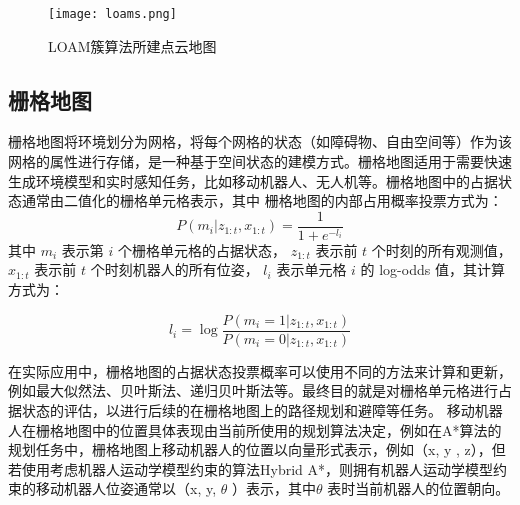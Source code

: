 \begin{figure}[ht]
    \centering
    \texttt{[image: loams.png]}
    \caption{LOAM簇算法所建点云地图}
\end{figure}

\subsection{栅格地图}
栅格地图将环境划分为网格，将每个网格的状态（如障碍物、自由空间等）作为该网格的属性进行存储，是一种基于空间状态的建模方式。栅格地图适用于需要快速生成环境模型和实时感知任务，比如移动机器人、无人机等。栅格地图中的占据状态通常由二值化的栅格单元格表示，其中
栅格地图的内部占用概率投票方式\cite{durrant2006simultaneous}为：
\begin{equation}
P(m_i | z_{1:t}, x_{1:t}) = \frac{1}{1 + e^{-l_i}}
\end{equation}
其中 $m_i$ 表示第 $i$ 个栅格单元格的占据状态， $z_{1:t}$ 表示前 $t$ 个时刻的所有观测值， $x_{1:t}$ 表示前 $t$ 个时刻机器人的所有位姿， $l_i$ 表示单元格 $i$ 的 log-odds 值，其计算方式为：

\begin{equation}
l_i = \log \frac{P(m_i = 1 | z_{1:t}, x_{1:t})}{P(m_i = 0 | z_{1:t}, x_{1:t})}
\end{equation}

在实际应用中，栅格地图的占据状态投票概率可以使用不同的方法来计算和更新，例如最大似然法、贝叶斯法、递归贝叶斯法等。最终目的就是对栅格单元格进行占据状态的评估，以进行后续的在栅格地图上的路径规划和避障等任务。
移动机器人在栅格地图中的位置具体表现由当前所使用的规划算法决定，例如在A*算法\cite{hart1968formal}的规划任务中，栅格地图上移动机器人的位置以向量形式表示，例如（x, y , z），但若使用考虑机器人运动学模型约束的算法Hybrid A*\cite{likhachev2008planning}，则拥有机器人运动学模型约束的移动机器人位姿通常以（x, y, $\theta$ ）表示，其中$\theta$ 表时当前机器人的位置朝向。


